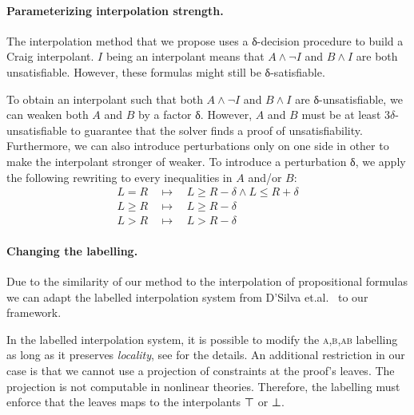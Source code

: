 \paragraph{Parameterizing interpolation strength.}

The interpolation method that we propose uses a δ-decision procedure to build a Craig interpolant.
$I$ being an interpolant means that $A ∧ ¬I$ and $B ∧ I$ are both unsatisfiable.
However, these formulas might still be δ-satisfiable.

To obtain an interpolant such that both $A ∧ ¬I$ and $B ∧ I$ are δ-unsatisfiable, we can weaken both $A$ and $B$ by a factor δ.
However, $A$ and $B$ must be at least $3δ$-unsatisfiable to guarantee that the solver finds a proof of unsatisfiability.
Furthermore, we can also introduce perturbations only on one side in other to make the interpolant stronger of weaker.
To introduce a perturbation δ, we apply the following rewriting to every inequalities in $A$ and/or $B$:
\begin{eqnarray*}
L = R & ~~ \mapsto ~~ & L ≥ R - δ ∧ L ≤ R + δ \\
L ≥ R & ~~ \mapsto ~~ & L ≥ R - δ \\
L > R & ~~ \mapsto ~~ & L > R - δ 
\end{eqnarray*}

\paragraph{Changing the labelling.}
Due to the similarity of our method to the interpolation of propositional formulas we can adapt the labelled interpolation system from D'Silva et.al.~\cite{DBLP:conf/vmcai/DSilvaKPW10} to our framework.

In the labelled interpolation system, it is possible to modify the \textsc{a,b,ab} labelling as long as it preserves \emph{locality}, see \cite{DBLP:conf/vmcai/DSilvaKPW10} for the details.
An additional restriction in our case is that we cannot use a projection of constraints at the proof's leaves.
The projection is not computable in nonlinear theories.
Therefore, the labelling must enforce that the leaves maps to the interpolants ⊤ or ⊥.
